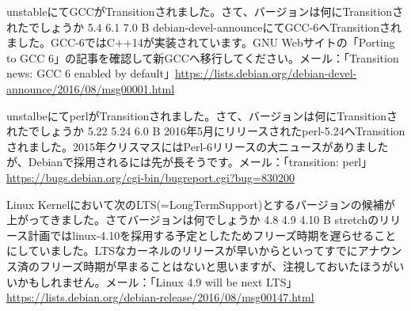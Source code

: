 %

\santaku
{unstableにてGCCがTransitionされました。さて、バージョンは何にTransitionされたでしょうか}
{5.4}
{6.1}
{7.0}
{B}
{debian-devel-announceにてGCC-6へTransitionされました。GCC-6ではC++14が実装されています。GNU Webサイトの「Porting to GCC 6」の記事を確認して新GCCへ移行してください。メール：「Transition news: GCC 6 enabled by default」\url{https://lists.debian.org/debian-devel-announce/2016/08/msg00001.html}}

\santaku
{unstalbeにてperlがTransitionされました。さて、バージョンは何にTransitionされたでしょうか}
{5.22}
{5.24}
{6.0}
{B}
{2016年5月にリリースされたperl-5.24へTransitionされました。2015年クリスマスにはPerl-6リリースの大ニュースがありましたが、Debianで採用されるには先が長そうです。メール：「transition: perl」\url{https://bugs.debian.org/cgi-bin/bugreport.cgi?bug=830200}}

\santaku
{Linux Kernelにおいて次のLTS(=LongTermSupport)とするバージョンの候補が上がってきました。さてバージョンは何でしょうか}
{4.8}
{4.9}
{4.10}
{B}
{stretchのリリース計画ではlinux-4.10を採用する予定としたためフリーズ時期を遅らせることにしていました。LTSなカーネルのリリースが早いからといってすでにアナウンス済のフリーズ時期が早まることはないと思いますが、注視しておいたほうがいいかもしれません。メール：「Linux 4.9 will be next LTS」\url{https://lists.debian.org/debian-release/2016/08/msg00147.html}}
